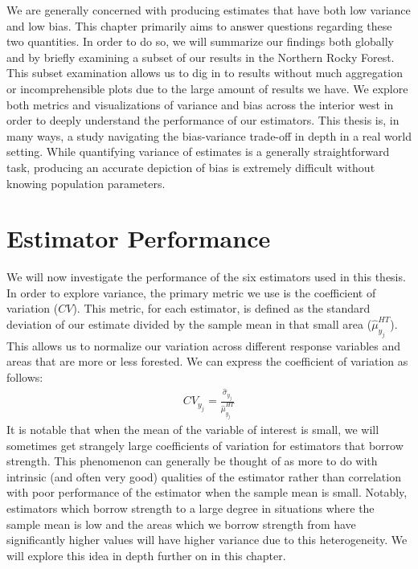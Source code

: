 \documentclass[12pt,twoside]{reedthesis}
\begin{document}
We are generally concerned with producing estimates that have both low variance and low bias. This chapter primarily aims to answer questions regarding these two quantities. In order to do so, we will summarize our findings both globally and by briefly examining a subset of our results in the Northern Rocky Forest. This subset examination allows us to dig in to results without much aggregation or incomprehensible plots due to the large amount of results we have. We explore both metrics and visualizations of variance and bias across the interior west in order to deeply understand the performance of our estimators. This thesis is, in many ways, a study navigating the bias-variance trade-off in depth in a real world setting. While quantifying variance of estimates is a generally straightforward task, producing an accurate depiction of bias is extremely difficult without knowing population parameters.

\hypertarget{estimator-performance}{%
\section{Estimator Performance}\label{estimator-performance}}

We will now investigate the performance of the six estimators used in this thesis. In order to explore variance, the primary metric we use is the coefficient of variation (\(CV\)). This metric, for each estimator, is defined as the standard deviation of our estimate divided by the sample mean in that small area (\(\hat \mu_{y_j}^{HT}\)). This allows us to normalize our variation across different response variables and areas that are more or less forested. We can express the coefficient of variation as follows:
\begin{align}
CV_{y_j} = \frac{\hat\sigma_{y_j}}{\hat\mu_{y_j}^{HT}}
\end{align}
It is notable that when the mean of the variable of interest is small, we will sometimes get strangely large coefficients of variation for estimators that borrow strength. This phenomenon can generally be thought of as more to do with intrinsic (and often very good) qualities of the estimator rather than correlation with poor performance of the estimator when the sample mean is small. Notably, estimators which borrow strength to a large degree in situations where the sample mean is low and the areas which we borrow strength from have significantly higher values will have higher variance due to this heterogeneity. We will explore this idea in depth further on in this chapter.
\end{document}
